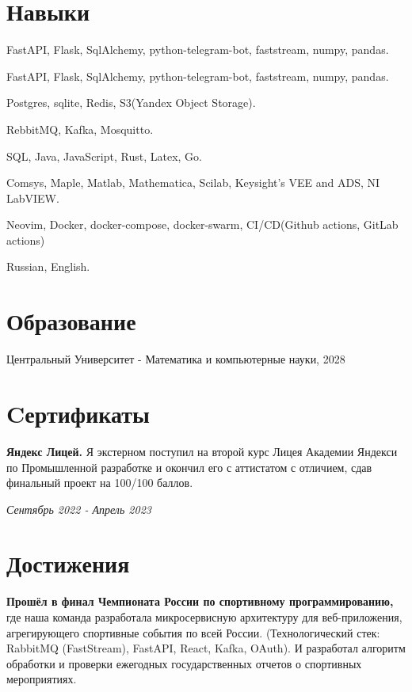 \documentclass[margin,line]{resume}
\begin{document}
\begin{resume}
  \section{\mysidestyle Навыки}
  \begin{description}[leftmargin=0pt, itemindent=*]
    \item[Python:] FastAPI, Flask, SqlAlchemy, python-telegram-bot,
      faststream, numpy, pandas.
    \item[Go] FastAPI, Flask, SqlAlchemy, python-telegram-bot,
      faststream, numpy, pandas.
    \item[Databases] Postgres, sqlite, Redis, S3(Yandex Object Storage).
    \item[Message brokers:] RebbitMQ, Kafka, Mosquitto.
    \item[Other techonologies:] SQL, Java, JavaScript, Rust, Latex, Go.
    \item[Scientific softwares] Comsys, Maple, Matlab, Mathematica,
      Scilab, Keysight's VEE and ADS, NI LabVIEW.
    \item[Dev tools:] Neovim, Docker, docker-compose, docker-swarm,
      CI/CD(Github actions, GitLab actions)
    \item[Languages:] Russian, English.
  \end{description}


  \section{\mysidestyle Образование}
  Центральный Университет - Математика и компьютерные науки, 2028

  \section{\mysidestyle Cертификаты}
  \textbf{Яндекс Лицей.} Я экстерном поступил на второй курс Лицея
  Академии Яндекси по Промышленной разработке и окончил его с
  аттистатом с отличием, сдав финальный проект на 100/100 баллов.
  \vspace{-6mm}

  \hfill \textsl{Сентябрь 2022 - Апрель 2023}

  \section{\mysidestyle Достижения}
  \textbf{Прошёл в финал Чемпионата России по спортивному
  программированию,} где наша команда разработала микросервисную
  архитектуру для веб-приложения, агрегирующего спортивные события по
  всей России. (Технологический стек: RabbitMQ (FastStream), FastAPI,
  React, Kafka, OAuth). И разработал алгоритм обработки и проверки
  ежегодных государственных отчетов о спортивных мероприятиях.


\end{resume}
\end{document}
